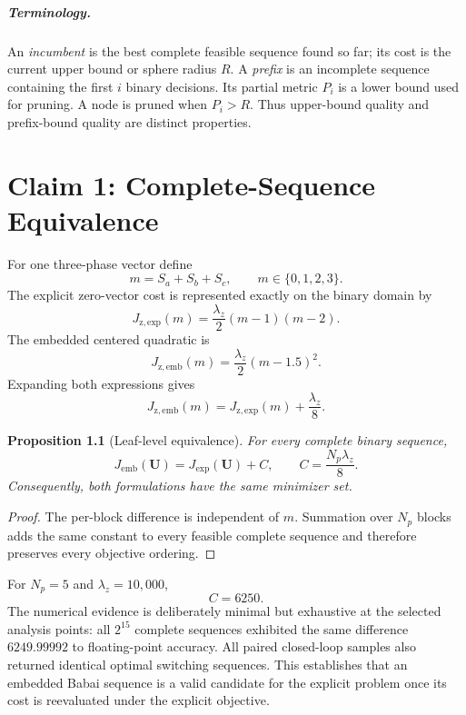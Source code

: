 \documentclass[paper=a4,oneside,fontsize=12pt,DIV=14,headings=normal,parskip=half,headsepline,numbers=noendperiod]{scrreprt}
\newcommand{\vct}[1]{\bm{#1}}
\newtheorem{proposition}{Proposition}[chapter]
\begin{document}
\paragraph{Terminology.}
An \emph{incumbent} is the best complete feasible sequence found so far; its
cost is the current upper bound or sphere radius $R$.  A \emph{prefix} is an
incomplete sequence containing the first $i$ binary decisions.  Its partial
metric $P_i$ is a lower bound used for pruning.  A node is pruned when
$P_i>R$.  Thus upper-bound quality and prefix-bound quality are distinct
properties.

\chapter{Claim 1: Complete-Sequence Equivalence}

For one three-phase vector define
\begin{equation}
 m=S_a+S_b+S_c,\qquad m\in\{0,1,2,3\}.
\end{equation}
The explicit zero-vector cost is represented exactly on the binary domain by
\begin{equation}
 J_{\mathrm{z,exp}}(m)=\frac{\lambda_z}{2}(m-1)(m-2).
\end{equation}
The embedded centered quadratic is
\begin{equation}
 J_{\mathrm{z,emb}}(m)=\frac{\lambda_z}{2}(m-1.5)^2.
\end{equation}
Expanding both expressions gives
\begin{equation}
 J_{\mathrm{z,emb}}(m)
 =J_{\mathrm{z,exp}}(m)+\frac{\lambda_z}{8}.
\end{equation}

\begin{proposition}[Leaf-level equivalence]
For every complete binary sequence,
\begin{equation}
 J_{\mathrm{emb}}(\vct U)
 =J_{\mathrm{exp}}(\vct U)+C,
 \qquad C=\frac{N_p\lambda_z}{8}.
 \label{eq:leaf_equivalence}
\end{equation}
Consequently, both formulations have the same minimizer set.
\end{proposition}
\begin{proof}
The per-block difference is independent of $m$.  Summation over $N_p$ blocks
adds the same constant to every feasible complete sequence and therefore
preserves every objective ordering.
\end{proof}

For $N_p=5$ and $\lambda_z=10{,}000$,
\begin{equation}
 C=6250.
\end{equation}
The numerical evidence is deliberately minimal but exhaustive at the selected
analysis points: all $2^{15}$ complete sequences exhibited the same difference
$6249.99992$ to floating-point accuracy.  All paired closed-loop samples also
returned identical optimal switching sequences.  This establishes that an
embedded Babai sequence is a valid candidate for the explicit problem once its
cost is reevaluated under the explicit objective.
\end{document}
